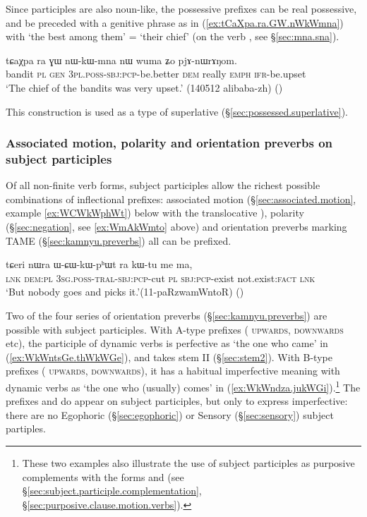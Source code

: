 Since participles are also noun-like, the possessive prefixes can be real possessive, and be preceded with a genitive phrase as in (\ref{ex:tCaXpa.ra.GW.nWkWmna}) with  `the best among them' = `their chief' (on the verb , see §\ref{sec:mna.sna}).

 \begin{exe} 
\ex \label{ex:tCaXpa.ra.GW.nWkWmna}
\gll tɕaχpa ra ɣɯ nɯ-kɯ-mna nɯ wuma ʑo pjɤ-nɯrɤŋom.\\
bandit \textsc{pl} \textsc{gen} \textsc{3pl}.\textsc{poss}-\textsc{sbj}:\textsc{pcp}-be.better \textsc{dem} really \textsc{emph} \textsc{ifr}-be.upset\\
\glt `The chief of the bandits was very upset.' (140512 alibaba-zh)
()
\end{exe}

This construction is used as a type of superlative (§\ref{sec:possessed.superlative}).

\subsubsection{Associated motion, polarity and orientation preverbs on subject participles}  \label{sec:subject.participle.other.prefixes}
Of all non-finite verb forms, subject participles allow the richest possible combinations of inflectional prefixes: associated motion (§\ref{sec:associated.motion}, example \ref{ex:WCWkWphWt}) below with the translocative ), polarity (§\ref{sec:negation}, see \ref{ex:WmAkWmto} above) and orientation preverbs marking TAME (§\ref{sec:kamnyu.preverbs}) all can be prefixed. 
 
\begin{exe}
\ex \label{ex:WCWkWphWt}
 \gll tɕeri nɯra ɯ-ɕɯ-kɯ-pʰɯt ra kɯ-tu me ma,   \\
 \textsc{lnk} \textsc{dem}:\textsc{pl} \textsc{3sg}.\textsc{poss}-\textsc{tral}-\textsc{sbj}:\textsc{pcp}-cut \textsc{pl} \textsc{sbj}:\textsc{pcp}-exist not.exist:\textsc{fact} \textsc{lnk} \\
 \glt `But nobody goes and picks it.'(11-paRzwamWntoR)
()
\end{exe}

Two of the four series of orientation preverbs (§\ref{sec:kamnyu.preverbs}) are possible with subject participles. With A-type prefixes ( \textsc{upwards},  \textsc{downwards} etc), the participle of dynamic verbs is perfective as  `the one who came' in (\ref{ex:WkWntsGe.thWkWGe}), and takes stem II (§\ref{sec:stem2}). With B-type prefixes ( \textsc{upwards},  \textsc{downwards}), it has a habitual imperfective meaning with dynamic verbs as  `the one who (usually) comes' in (\ref{ex:WkWndza.jukWGi}).\footnote{These two examples also illustrate the use of subject participles as purposive complements with the forms  and  (see §\ref{sec:subject.participle.complementation}, §\ref{sec:purposive.clause.motion.verbs}).} The prefixes  and  do appear on subject participles, but only to express imperfective: there are no Egophoric (§\ref{sec:egophoric}) or Sensory (§\ref{sec:sensory}) subject partiples.

